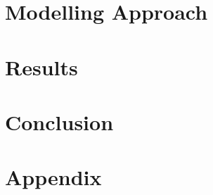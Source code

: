 \documentclass[edeposit,fullpage,12pt]{uiucthesis2018}
\begin{document}
\chapter{Modelling Approach}


\chapter{Results}


\chapter{Conclusion}
%

\chapter*{Appendix}


\backmatter



\end{document}
